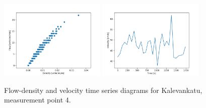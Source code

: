 \documentclass[english, 12pt, a4paper, elec, utf8, pdfa, online]{aaltothesis}
\begin{document}
\begin{figure}[ht!]
    \centering
    \includegraphics[width=0.45\textwidth]{graphs/Kalevankatu_4_flw_dns.png}
    \includegraphics[width=0.45\textwidth]{graphs/Kalevankatu_4_spd_time_6.png}
    \caption{Flow-density and velocity time series diagrams for Kalevankatu, measurement point 4.}
\end{figure}
\end{document}
